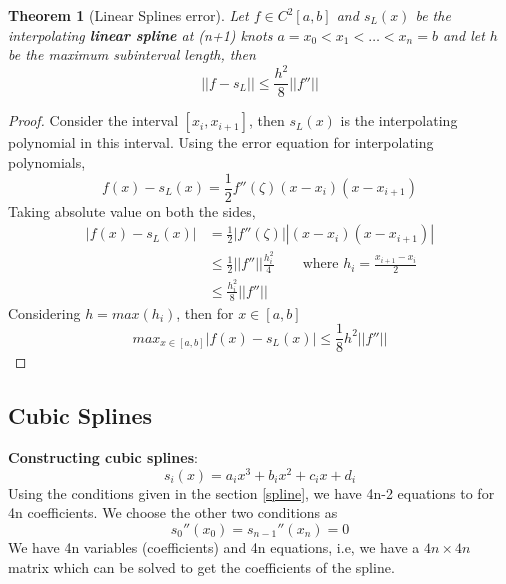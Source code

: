 \documentclass{article}
\newtheorem*{theorem}{Theorem}
\begin{document}
	\begin{theorem}[Linear Splines error]
	\label{linear}
		Let $f\in C^2[a,b]$ and $s_L(x)$ be the interpolating \textbf{linear spline} at (n+1) knots $a=x_0<x_1<\hdots<x_n=b$ and let $h$ be the maximum subinterval length, then
			\[\boxed{||f-s_L|| \leq \frac{h^2}{8} ||f''||}\] 
	\end{theorem}
	\begin{proof}
		Consider the interval $[x_i,x_{i+1}]$, then $s_L (x)$ is the interpolating polynomial in this interval. Using the error equation for interpolating polynomials,
		\[f(x)-s_L(x)=\frac{1}{2} f''(\zeta) (x-x_i)(x-x_{i+1})\]
		Taking absolute value on both the sides,
		\begin{align*}
			|f(x)-s_L(x)| &= \frac{1}{2} |f''(\zeta)| |(x-x_i)(x-x_{i+1})|\\
						&\leq \frac{1}{2} ||f''|| \frac{h_i^2}{4} \qquad \text{where $h_i = \frac{x_{i+1}-x_i}{2}$ }\\
						&\leq \frac{h_i^2}{8} ||f''||
		\end{align*}
		Considering $h=max (h_i)$, then for $x\in [a,b]$
			\[max_{x\in [a,b]}|f(x)-s_L(x)| \leq \frac{1}{8} h^2||f''||\]

	\end{proof}



\subsection{Cubic Splines}
	\textbf{Constructing cubic splines}:\\
	\[s_i(x) = a_ix^3 + b_ix^2 + c_ix +d_i\]
	Using the conditions given in the section \ref{spline}, we have 4n-2 equations to for 4n coefficients. We choose the other two conditions as 
	\[s_0''(x_0) = s_{n-1}''(x_n)=0\]
	We have 4n variables (coefficients) and 4n equations, i.e, we have a $4n\times4n$ matrix which can be solved to get the coefficients of the spline.\\
\end{document}
